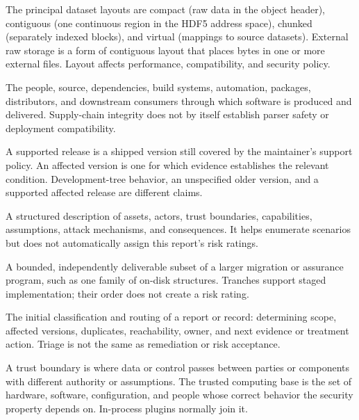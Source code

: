 \documentclass[../main.tex]{subfiles}
\begin{document}
\begin{description}[leftmargin=1.5em,style=nextline]
\item[Storage layout.]
The principal dataset layouts are compact (raw data in the object header),
contiguous (one continuous region in the HDF5 address space), chunked
(separately indexed blocks), and virtual (mappings to source datasets).
External raw storage is a form of contiguous layout that places bytes in one or
more external files. Layout affects performance, compatibility, and security
policy.

\item[Supply chain.]
The people, source, dependencies, build systems, automation, packages,
distributors, and downstream consumers through which software is produced and
delivered. Supply-chain integrity does not by itself establish parser safety or
deployment compatibility.

\item[Supported release / affected version.]
A supported release is a shipped version still covered by the maintainer's
support policy. An affected version is one for which evidence establishes the
relevant condition. Development-tree behavior, an unspecified older version,
and a supported affected release are different claims.

\item[Threat model.]
A structured description of assets, actors, trust boundaries, capabilities,
assumptions, attack mechanisms, and consequences. It helps enumerate scenarios
but does not automatically assign this report's risk ratings.

\item[Tranche.]
A bounded, independently deliverable subset of a larger migration or assurance
program, such as one family of on-disk structures. Tranches support staged
implementation; their order does not create a risk rating.

\item[Triage.]
The initial classification and routing of a report or record: determining
scope, affected versions, duplicates, reachability, owner, and next evidence or
treatment action. Triage is not the same as remediation or risk acceptance.

\item[Trust boundary / trusted computing base.]
A trust boundary is where data or control passes between parties or components
with different authority or assumptions. The trusted computing base is the set
of hardware, software, configuration, and people whose correct behavior the
security property depends on. In-process plugins normally join it.


\end{description}
\end{document}
